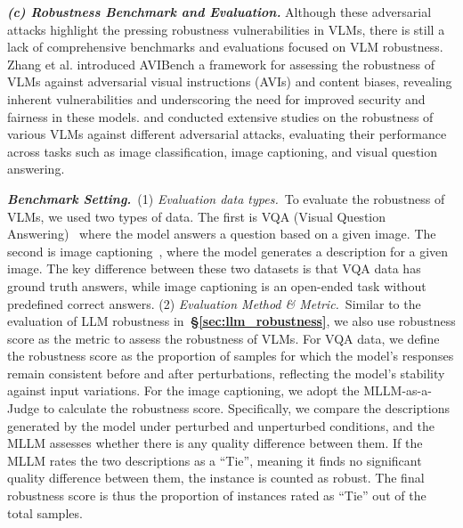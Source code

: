 \textit{\textbf{(c) Robustness Benchmark and Evaluation.}} Although these adversarial attacks highlight the pressing robustness vulnerabilities in VLMs, there is still a lack of comprehensive benchmarks and evaluations focused on VLM robustness. Zhang et al. introduced AVIBench \cite{zhang2024avibench} a framework for assessing the robustness of VLMs against adversarial visual instructions (AVIs) and content biases, revealing inherent vulnerabilities and underscoring the need for improved security and fairness in these models. \cite{cui2024robustness} and \cite{agarwal2024mvtamperbench} conducted extensive studies on the robustness of various VLMs against different adversarial attacks, evaluating their performance across tasks such as image classification, image captioning, and visual question answering.

\textit{\textbf{Benchmark Setting.}}~(1) \textit{Evaluation data types.}~To evaluate the robustness of VLMs, we used two types of data. The first is VQA (Visual Question Answering)~\cite{goyal2017making} where the model answers a question based on a given image. The second is image captioning~\cite{lin2014microsoft}, where the model generates a description for a given image. The key difference between these two datasets is that VQA data has ground truth answers, while image captioning is an open-ended task without predefined correct answers.
(2) \textit{Evaluation Method \& Metric.}~Similar to the evaluation of LLM robustness in~\textbf{\S\ref{sec:llm_robustness}}, we also use robustness score as the metric to assess the robustness of VLMs. For VQA data, we define the robustness score as the proportion of samples for which the model’s responses remain consistent before and after perturbations, reflecting the model’s stability against input variations. 
For the image captioning, we adopt the MLLM-as-a-Judge to calculate the robustness score. Specifically, we compare the descriptions generated by the model under perturbed and unperturbed conditions, and the MLLM assesses whether there is any quality difference between them. If the MLLM rates the two descriptions as a ``Tie'', meaning it finds no significant quality difference between them, the instance is counted as robust. The final robustness score is thus the proportion of instances rated as ``Tie'' out of the total samples.
